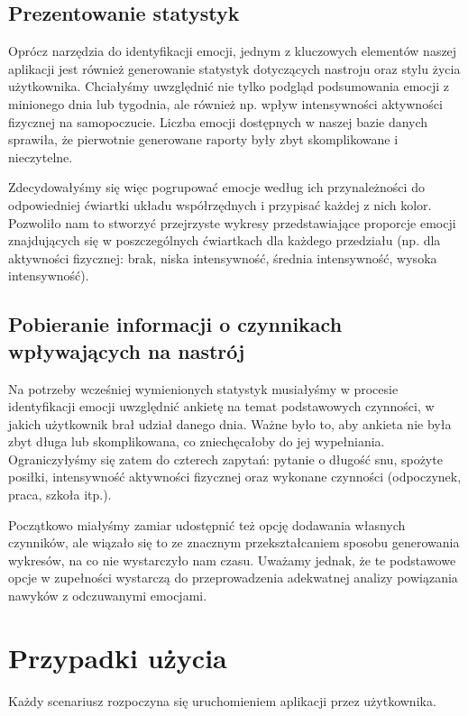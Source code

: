 \documentclass[inz, shortabstract]{iithesis}
\begin{document}
\section{Prezentowanie statystyk}
Oprócz narzędzia do identyfikacji emocji, jednym z kluczowych elementów naszej aplikacji jest również generowanie statystyk dotyczących nastroju oraz stylu życia użytkownika. Chciałyśmy uwzględnić nie tylko podgląd podsumowania emocji z minionego dnia lub tygodnia, ale również np. wpływ intensywności aktywności fizycznej na samopoczucie. Liczba emocji dostępnych w naszej bazie danych sprawiła, że pierwotnie generowane raporty były zbyt skomplikowane i nieczytelne.

Zdecydowałyśmy się więc pogrupować emocje według ich przynależności do odpowiedniej ćwiartki układu współrzędnych i przypisać każdej z nich kolor. Pozwoliło nam to stworzyć przejrzyste wykresy przedstawiające proporcje emocji znajdujących się w poszczególnych ćwiartkach dla każdego przedziału (np. dla aktywności fizycznej: brak, niska intensywność, średnia intensywność, wysoka intensywność). 

\section{Pobieranie informacji o czynnikach wpływających na nastrój}
Na potrzeby wcześniej wymienionych statystyk musiałyśmy w procesie identyfikacji emocji uwzględnić ankietę na temat podstawowych czynności, w jakich użytkownik brał udział danego dnia. Ważne było to, aby ankieta nie była zbyt długa lub skomplikowana, co zniechęcałoby do jej wypełniania. Ograniczyłyśmy się zatem do czterech zapytań: pytanie o długość snu, spożyte posiłki, intensywność aktywności fizycznej oraz wykonane czynności (odpoczynek, praca, szkoła itp.). 

Początkowo miałyśmy zamiar udostępnić też opcję dodawania własnych czynników, ale wiązało się to ze znacznym przekształcaniem sposobu generowania wykresów, na co nie wystarczyło nam czasu. Uważamy jednak, że te podstawowe opcje w zupełności wystarczą do przeprowadzenia adekwatnej analizy powiązania nawyków z odczuwanymi emocjami.

\chapter{Przypadki użycia}

Każdy scenariusz rozpoczyna się uruchomieniem aplikacji przez użytkownika.
\end{document}
